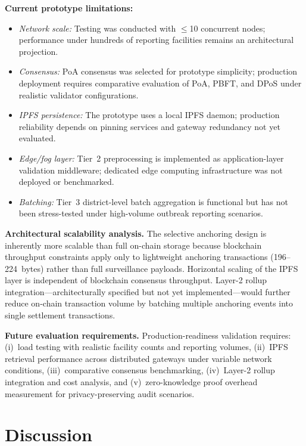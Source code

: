 \documentclass[AMA,LATO1COL]{WileyNJD-v2}
\begin{document}
\textbf{Current prototype limitations:}
\begin{itemize}
\item \emph{Network scale:} Testing was conducted with $\leq$10 concurrent nodes; performance under hundreds of reporting facilities remains an architectural projection.
\item \emph{Consensus:} PoA consensus was selected for prototype simplicity; production deployment requires comparative evaluation of PoA, PBFT, and DPoS under realistic validator configurations.
\item \emph{IPFS persistence:} The prototype uses a local IPFS daemon; production reliability depends on pinning services and gateway redundancy not yet evaluated.
\item \emph{Edge/fog layer:} Tier~2 preprocessing is implemented as application-layer validation middleware; dedicated edge computing infrastructure was not deployed or benchmarked.
\item \emph{Batching:} Tier~3 district-level batch aggregation is functional but has not been stress-tested under high-volume outbreak reporting scenarios.
\end{itemize}

\textbf{Architectural scalability analysis.} The selective anchoring design is inherently more scalable than full on-chain storage because blockchain throughput constraints apply only to lightweight anchoring transactions (196--224~bytes) rather than full surveillance payloads. Horizontal scaling of the IPFS layer is independent of blockchain consensus throughput. Layer-2 rollup integration---architecturally specified but not yet implemented---would further reduce on-chain transaction volume by batching multiple anchoring events into single settlement transactions.

\textbf{Future evaluation requirements.} Production-readiness validation requires: (i)~load testing with realistic facility counts and reporting volumes, (ii)~IPFS retrieval performance across distributed gateways under variable network conditions, (iii)~comparative consensus benchmarking, (iv)~Layer-2 rollup integration and cost analysis, and (v)~zero-knowledge proof overhead measurement for privacy-preserving audit scenarios.

\section{Discussion}\label{sec:discussion}
\end{document}
